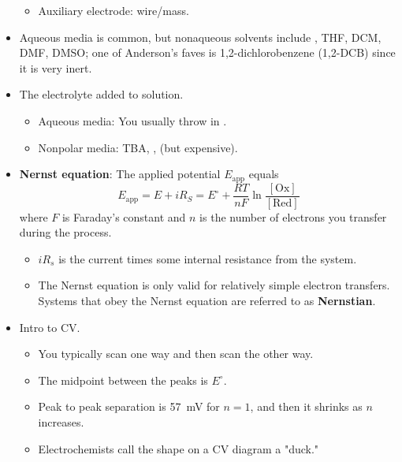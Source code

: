 \documentclass[../notes.tex]{subfiles}
\begin{document}
\begin{itemize}
\begin{itemize}
        \item Auxiliary electrode:  wire/mass.
    \end{itemize}
    \item Aqueous media is common, but nonaqueous solvents include , THF, DCM, DMF, DMSO; one of Anderson's faves is 1,2-dichlorobenzene (1,2-DCB) since it is very inert.
    \item The electrolyte added to solution.
    \begin{itemize}
        \item Aqueous media: You usually throw in .
        \item Nonpolar media: TBA, ,  (but expensive).
    \end{itemize}
    \item \textbf{Nernst equation}: The applied potential $E_\text{app}$ equals
    \begin{equation*}
        E_\text{app} = E+iR_S
        = E^\circ+\frac{RT}{nF}\ln\frac{[\text{Ox}]}{[\text{Red}]}
    \end{equation*}
    where $F$ is Faraday's constant and $n$ is the number of electrons you transfer during the process.
    \begin{itemize}
        \item $iR_s$ is the current times some internal resistance from the system.
        \item The Nernst equation is only valid for relatively simple electron transfers. Systems that obey the Nernst equation are referred to as \textbf{Nernstian}.
    \end{itemize}
    \item Intro to CV.
    \begin{itemize}
        \item You typically scan one way and then scan the other way.
        \item The midpoint between the peaks is $E^\circ$.
        \item Peak to peak separation is \SI{57}{\milli\volt} for $n=1$, and then it shrinks as $n$ increases.
        \item Electrochemists call the shape on a CV diagram a "duck."
    \end{itemize}
\end{itemize}
\end{document}
